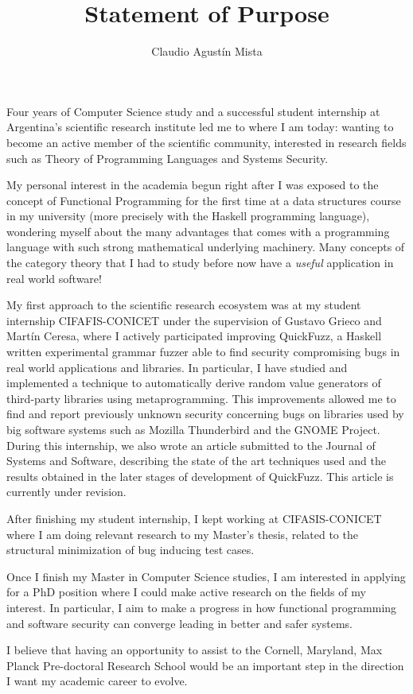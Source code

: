 \documentclass[helvetica,openbib,logo,notitle,flagCMYK,totpages]{europecv}
\title{Statement of Purpose}
\author{Claudio Agust\'in Mista}
\date{}
\begin{document}

\maketitle 
   
    Four years of Computer Science study and a successful student internship at
    Argentina's scientific research institute led me to where I am today:
    wanting to become an active member of the scientific community, interested
    in research fields such as Theory of Programming Languages and Systems
    Security. 

    My personal interest in the academia begun right after I was exposed to the
    concept of Functional Programming for the first time at a data structures
    course in my university (more precisely with the Haskell programming
    language), wondering myself about the many advantages that comes with a
    programming language with such strong mathematical underlying machinery.
    Many concepts of the category theory that I had to study before now have a
    \emph{useful} application in real world software! 

    My first approach to the scientific research ecosystem was at my student
    internship CIFAFIS-CONICET under the supervision of Gustavo Grieco and
    Mart\'in Ceresa, where I actively participated improving QuickFuzz, a
    Haskell written experimental grammar fuzzer able to find security
    compromising bugs in real world applications and libraries. In particular,
    I have studied and implemented a technique to automatically derive random
    value generators of third-party libraries using metaprogramming. This
    improvements allowed me to find and report previously unknown security
    concerning bugs on libraries used by big software systems such as Mozilla
    Thunderbird and the GNOME Project. During this internship, we also wrote an
    article submitted to the Journal of Systems and Software, describing the
    state of the art techniques used and the results obtained in the later
    stages of development of QuickFuzz. This article is currently under
    revision. 

    After finishing my student internship, I kept working at CIFASIS-CONICET
    where I am doing relevant research to my Master's thesis, related to the
    structural minimization of bug inducing test cases.   

    Once I finish my Master in Computer Science studies, I am interested in
    applying for a PhD position where I could make active research on the
    fields of my interest. In particular, I aim to make a progress in how
    functional programming and software security can converge leading in better
    and safer systems. 

    I believe that having an opportunity to assist to the Cornell, Maryland,
    Max Planck Pre-doctoral Research School would be an important step in the
    direction I want my academic career to evolve.
\end{document}
